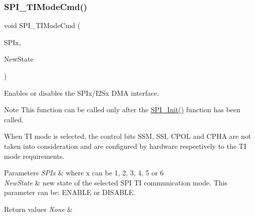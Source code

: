 \subsubsection{\texorpdfstring{S\+P\+I\+\_\+\+T\+I\+Mode\+Cmd()}{SPI\_TIModeCmd()}}
{\footnotesize\ttfamily void S\+P\+I\+\_\+\+T\+I\+Mode\+Cmd (\begin{DoxyParamCaption}\item[{S\+P\+I\+\_\+\+Type\+Def $\ast$}]{S\+P\+Ix,  }\item[{Functional\+State}]{New\+State }\end{DoxyParamCaption})}



Enables or disables the S\+P\+Ix/\+I2\+Sx D\+MA interface. 

\begin{DoxyNote}{Note}
This function can be called only after the \mbox{\hyperlink{group___s_p_i___group1_ga8dacc1dc48bf08c0f12da409f4889037}{S\+P\+I\+\_\+\+Init()}} function has been called. 

When TI mode is selected, the control bits S\+SM, S\+SI, C\+P\+OL and C\+P\+HA are not taken into consideration and are configured by hardware respectively to the TI mode requirements. ~\newline
 
\end{DoxyNote}

\begin{DoxyParams}{Parameters}
{\em S\+P\+Ix} & where x can be 1, 2, 3, 4, 5 or 6 \\
\hline
{\em New\+State} & new state of the selected S\+PI TI communication mode. This parameter can be\+: E\+N\+A\+B\+LE or D\+I\+S\+A\+B\+LE. \\
\hline
\end{DoxyParams}

\begin{DoxyRetVals}{Return values}
{\em None} & \\
\hline
\end{DoxyRetVals}
